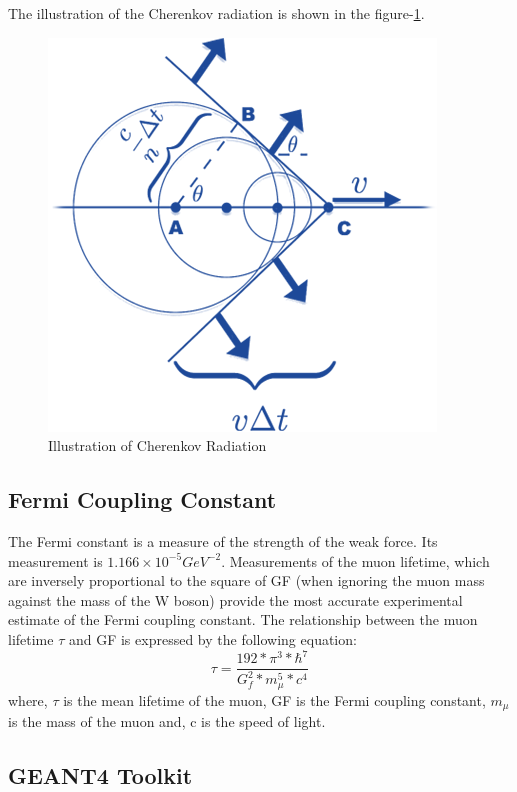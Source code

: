 \documentclass{article}
\begin{document}
\begin{multicols}{2}
The illustration of the Cherenkov radiation is shown in the figure-\ref{cherenkov}.

\begin{figure}[H]
    \centering
    \includegraphics[scale=0.5]{Images/cherenkovcone.png}
    \caption{Illustration of Cherenkov Radiation}
    \label{cherenkov}
\end{figure}



\subsection{Fermi Coupling Constant}

The Fermi constant is a measure of the strength of the weak force.  Its measurement is $1.166 \times 10^{-5}GeV^{-2}$. Measurements of the muon lifetime, which are inversely proportional to the square of GF (when ignoring the muon mass against the mass of the W boson) provide the most accurate experimental estimate of the Fermi coupling constant. The relationship between the muon lifetime $\tau$ and GF is expressed by the following equation:
 \begin{equation}
     \tau=\frac{192*\pi^3*\hbar^7}{G_f^2*m_\mu^5*c^4}
 \end{equation}
where, $\tau$ is the mean lifetime of the muon, GF is the Fermi coupling constant, $m_\mu$ is the mass of the muon and, c is the speed of light.





\subsection{GEANT4 Toolkit}


\end{multicols}
\end{document}
